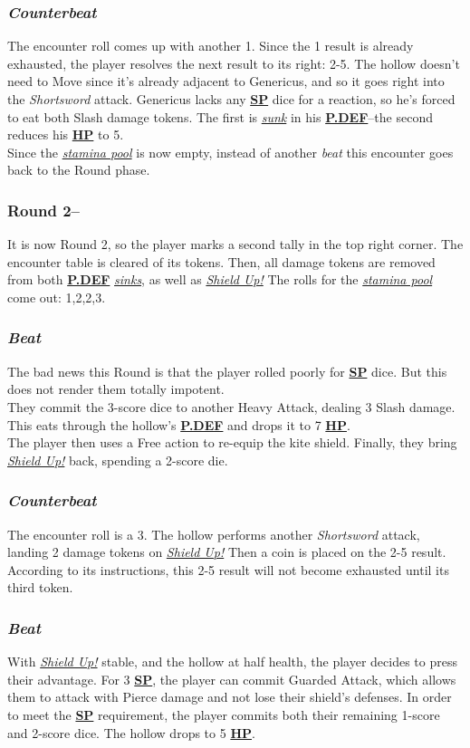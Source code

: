 \documentclass[12pt]{article}
\newcommand{\refto}[1]{\hyperlink{#1}{\textbf{#1}}}
\newcommand{\reftoit}[1]{\hyperlink{#1}{\emph{#1}}}
\begin{document}
\begin{multicols*}{2}
\subsubsection*{\emph{Counterbeat}}
The encounter roll comes up with another 1. Since the 1 result is already exhausted, the player resolves the next result to its right: 2-5. The hollow doesn’t need to Move since it’s already adjacent to Genericus, and so it goes right into the \emph{Shortsword} attack. Genericus lacks any \refto{SP} dice for a reaction, so he’s forced to eat both Slash damage tokens. The first is \reftoit{sunk} in his \refto{P.DEF}--the second reduces his \refto{HP} to 5.\\
Since the \reftoit{stamina pool} is now empty, instead of another \emph{beat} this encounter goes back to the Round phase.

\subsubsection*{Round 2--}
It is now Round 2, so the player marks a second tally in the top right corner. The encounter table is cleared of its tokens. Then, all damage tokens are removed from both \refto{P.DEF} \reftoit{sinks}, as well as \reftoit{Shield Up!} The rolls for the \reftoit{stamina pool} come out: 1,2,2,3.
\subsubsection*{\emph{Beat}}
The bad news this Round is that the player rolled poorly for \refto{SP} dice. But this does not render them totally impotent.\\
They commit the 3-score dice to another Heavy Attack, dealing 3 Slash damage. This eats through the hollow’s \refto{P.DEF} and drops it to 7 \refto{HP}.\\
The player then uses a Free action to re-equip the kite shield. Finally, they bring \reftoit{Shield Up!} back, spending a 2-score die.
\subsubsection*{\emph{Counterbeat}}
The encounter roll is a 3. The hollow performs another \emph{Shortsword} attack, landing 2 damage tokens on \reftoit{Shield Up!} Then a coin is placed on the 2-5 result. According to its instructions, this 2-5 result will not become exhausted until its third token.
\subsubsection*{\emph{Beat}}
With \reftoit{Shield Up!} stable, and the hollow at half health, the player decides to press their advantage. For 3 \refto{SP}, the player can commit Guarded Attack, which allows them to attack with Pierce damage and not lose their shield’s defenses. In order to meet the \refto{SP} requirement, the player commits both their remaining 1-score and 2-score dice. The hollow drops to 5 \refto{HP}.

\end{multicols*}
\end{document}
